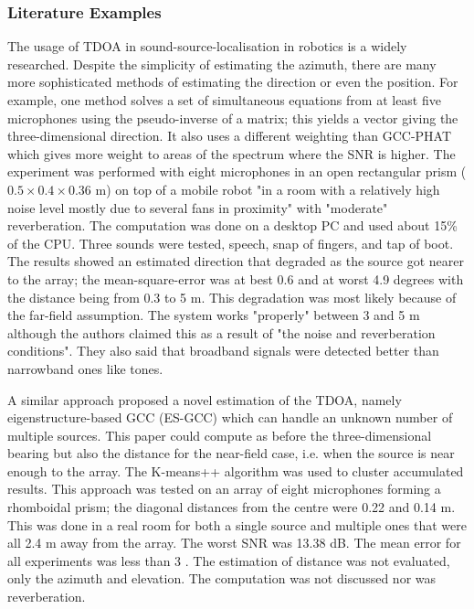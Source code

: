 \documentclass{report}
\begin{document}
\subsubsection{Literature Examples}

The usage of TDOA in sound-source-localisation in robotics is a widely researched. Despite the simplicity of estimating the azimuth, there are many more sophisticated methods of estimating the direction or even the position. For example, one method \cite{valin_robust_2003} solves a set of simultaneous equations from at least five microphones using the pseudo-inverse of a matrix; this yields a vector giving the three-dimensional direction. It also uses a different weighting than GCC-PHAT which gives more weight to areas of the spectrum where the SNR is higher. The experiment was performed with eight microphones in an open rectangular prism ($0.5\times 0.4\times 0.36$ \si{m}) on top of a mobile robot "in a room with a relatively high noise level mostly due to several fans in proximity" with "moderate" reverberation. The computation was done on a desktop PC and used about 15\% of the CPU. Three sounds were tested, speech, snap of fingers, and tap of boot. The results showed an estimated direction that degraded as the source got nearer to the array; the mean-square-error was at best 0.6 and at worst 4.9 degrees with the distance being from 0.3 to 5 \si{m}. This degradation was most likely because of the far-field assumption. The system works "properly" between 3 and 5 \si{m} although the authors claimed this as a result of "the noise and reverberation conditions". They also said that broadband signals were detected better than narrowband ones like tones.

A similar approach \cite{hu_estimation_2009} proposed a novel estimation of the TDOA, namely eigenstructure-based GCC (ES-GCC) which can handle an unknown number of multiple sources. This paper could compute as before the three-dimensional bearing but also the distance for the near-field case, i.e. when the source is near enough to the array. The K-means++ algorithm was used to cluster accumulated results. This approach was tested on an array of eight microphones forming a rhomboidal prism; the diagonal distances from the centre were 0.22 and 0.14 \si{m}. This was done in a real room for both a single source and multiple ones that were all 2.4 \si{m} away from the array. The worst SNR was 13.38 \si{dB}. The mean error for all experiments was less than 3 \si{\deg}. The estimation of distance was not evaluated, only the azimuth and elevation. The computation was not discussed nor was reverberation.
\end{document}
